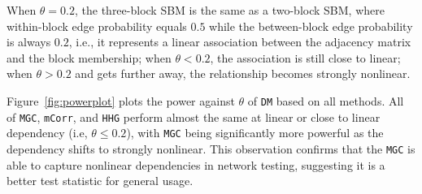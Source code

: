 \documentclass[11pt]{article}
\theoremstyle{definition}
\begin{document}
When $\theta = 0.2$, the three-block SBM is the same as a two-block SBM, where within-block edge probability equals $0.5$ while the between-block edge probability is always $0.2$, i.e., it represents a linear association between the adjacency matrix and the block membership; when $\theta<0.2$, the association is still close to linear; when $\theta > 0.2$ and gets further away, the relationship becomes strongly nonlinear.

Figure~\ref{fig:powerplot} plots the power against $\theta$ of \texttt{DM} based on all methods. All of \texttt{MGC}, \texttt{mCorr}, and \texttt{HHG} perform almost the same at linear or close to linear dependency (i.e, $\theta \leq 0.2$), with \texttt{MGC} being significantly more powerful as the dependency shifts to strongly nonlinear. This observation confirms that the \texttt{MGC} is able to capture nonlinear dependencies in network testing, suggesting it is a better test statistic for general usage.
\end{document}
